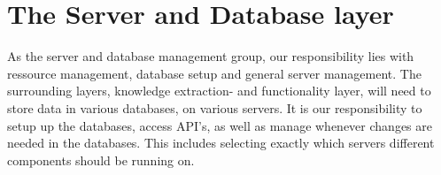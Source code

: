 \section{The Server and Database layer}

As the server and database management group, our responsibility lies with ressource management, database setup and general server management. The surrounding layers, knowledge extraction- and functionality layer, will need to store data in various databases, on various servers. It is our responsibility to setup up the databases, access API's, as well as manage whenever changes are needed in the databases. This includes selecting exactly which servers different components should be running on.

